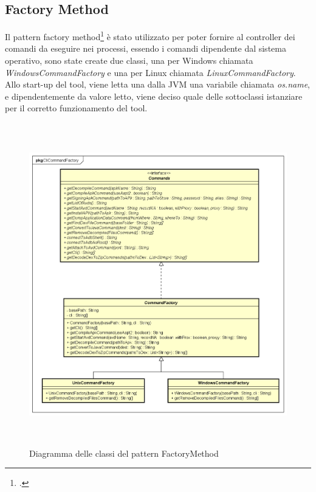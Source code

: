 \subsection{Factory Method}\label{subsec:factory-method}
Il pattern factory method\footcite{womak:factory-method} è stato utilizzato per poter fornire al controller dei comandi da eseguire nei processi, essendo i comandi dipendente dal sistema operativo, sono state create due classi, una per Windows chiamata \textit{WindowsCommandFactory} e una per Linux chiamata \textit{LinuxCommandFactory}.
Allo start-up del tool, viene letta una dalla JVM una variabile chiamata \textit{os.name}, e dipendentemente da valore letto, viene deciso quale delle sottoclassi istanziare per il corretto funzionamento del tool.
\begin{figure}[H]
    \centering
    \includegraphics[width=14cm, height=14cm]{./immagini/diagrammi_uml/CommandFactory.png}
    \caption{Diagramma delle classi del pattern FactoryMethod}\label{fig:factory-method}
\end{figure}